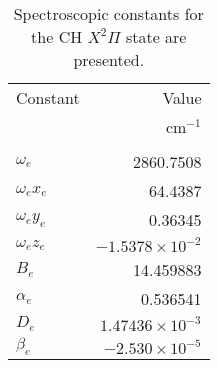 \begin{table}
  \caption[Spectroscopic constants for the CH \(X^2\Pi\) state]{Spectroscopic constants for the CH \(X^2\Pi\) state are presented.}
  \begin{center}
    \begin{tabular}{lr}
      Constant & Value \tabularnewline
      & cm\(^{-1}\) \tabularnewline
      \hline\hline
      & \tabularnewline
      \(\omega_e\) & 2860.7508 \tabularnewline
      \(\omega_ex_e\) & 64.4387 \tabularnewline
      \(\omega_ey_e\) & 0.36345 \tabularnewline
      \(\omega_ez_e\) & \(-1.5378 \times 10^{-2}\) \tabularnewline
      \(B_e\) & 14.459883 \tabularnewline
      \(\alpha_e\) & 0.536541 \tabularnewline
      \(D_e\) & \(1.47436 \times 10^{-3}\) \tabularnewline
      \(\beta_e\) & \(-2.530 \times 10^{-5}\) \tabularnewline
      \hline
    \end{tabular}
  \end{center}
  \label{tab:spectroscopicConstants}
\end{table}

